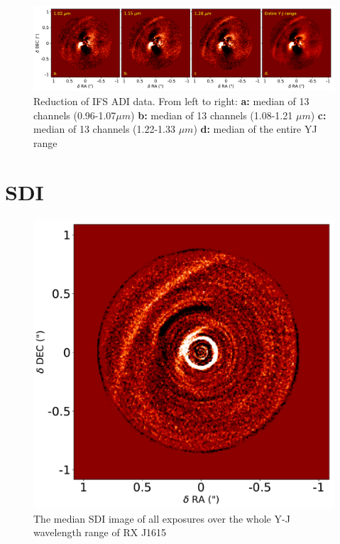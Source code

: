 \documentclass[twoside,single]{lion-msc}
\begin{document}
\begin{figure}[htb]
\centering
\includegraphics[trim={0cm 0cm 0cm 0cm},clip,width = \textwidth]{ADIwavelplot}
\caption{Reduction of IFS ADI data. From left to right: \textbf{a:} median of 13 channels (0.96-1.07$\mu m$) \textbf{b:} median of 13 channels (1.08-1.21 $\mu m$) \textbf{c:} median of 13 channels (1.22-1.33 $\mu m$) \textbf{d:} median of the entire YJ range}
\label{fig:ADIcolor}
\end{figure}

\clearpage
\section{SDI}
\begin{figure}
\vspace{-0.5 cm}
\centering
\includegraphics[width=\linewidth]{SDI_tot}
\caption{The median SDI image of all exposures over the whole Y-J wavelength range of RX J1615}
\label{fig:SDI_tot}
\vspace{-0.7 cm}
\end{figure}
\end{document}
